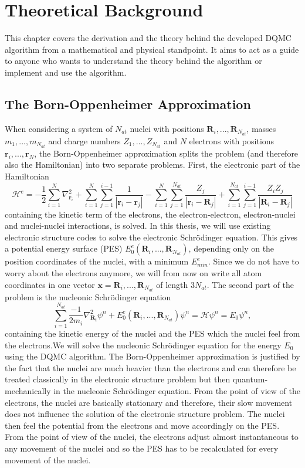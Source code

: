 \documentclass [12pt]{report}
\begin{document}
\chapter{Theoretical Background}
This chapter covers the derivation and the theory behind the developed DQMC algorithm from a mathematical and physical standpoint. It aims to act as a guide to anyone who wants to understand the theory behind the algorithm or implement and use the algorithm.

\section{The Born-Oppenheimer Approximation}
When considering a system of $N_{at}$ nuclei with positions $\bm{R}_i,...,\bm{R}_{N_{at}}$, masses $m_1,...,m_{N_{at}}$ and charge numbers $Z_1,...,Z_{N_{at}}$ and $N$ electrons with positions $\bm{r}_i,...,\bm{r}_{N}$, the Born-Oppenheimer approximation splits the problem (and therefore also the Hamiltonian) into two separate problems. First, the electronic part of the Hamiltonian
\begin{equation}
\mathcal{H}^e = - \frac{1}{2}\sum_{i=1}^N \nabla^2_{\bm{r}_i}  + \sum_{i=1}^{N} \sum_{j=1}^{i-1} \frac{1}{|\bm{r}_i-\bm{r}_j|} - \sum_{i=1}^{N} \sum_{j=1}^{N_{at}} \frac{Z_j}{|\bm{r}_i-\bm{R}_j|} + \sum_{i=1}^{N_{at}} \sum_{j=1}^{i-1} \frac{Z_i Z_j}{|\bm{R}_i-\bm{R}_j|}
\end{equation}
containing the kinetic term of the electrons, the electron-electron, electron-nuclei and nuclei-nuclei interactions, is solved. In this thesis, we will use existing electronic structure codes to solve the electronic Schrödinger equation. This gives a potential energy surface (PES) $E_0^e(\bm{R}_i,...,\bm{R}_{N_{at}})$, depending only on the position coordinates of the nuclei, with a minimum $E_{min}^e$. Since we do not have to worry about the electrons anymore, we will from now on write all atom coordinates in one vector $\bm{x} = \bm{R}_i,...,\bm{R}_{N_{at}}$ of length $3N_{at}$.
The second part of the problem is the nucleonic Schrödinger equation
\begin{equation} \label{eq:2.2}
\sum_{i=1}^{N_{at}} \frac{-1}{2m_i} \nabla^2_{\bm{R_i}} \psi^n + E_0^e(\bm{R}_i,...,\bm{R}_{N_{at}}) \psi^n = \mathcal{H} \psi^n = E_0 \psi^n,
\end{equation}
containing the kinetic energy of the nuclei and the PES which the nuclei feel from the electrons.We will solve the nucleonic Schrödinger equation for the energy $E_0$ using the DQMC algorithm. The Born-Oppenheimer approximation is justified by the fact that the nuclei are much heavier than the electrons and can therefore be treated classically in the electronic structure problem but then quantum-mechanically in the nucleonic Schrödinger equation. From the point of view of the electrons, the nuclei are basically stationary and therefore, their slow movement does not influence the solution of the electronic structure problem. The nuclei then feel the potential from the electrons and move accordingly on the PES. From the point of view of the nuclei, the electrons adjust almost instantaneous to any movement of the nuclei and so the PES has to be recalculated for every movement of the nuclei.\\
\end{document}
